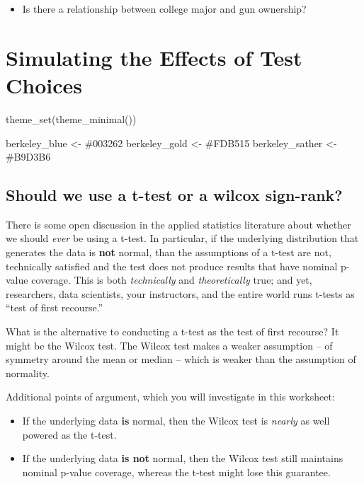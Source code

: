 \documentclass[
  letterpaper,
  DIV=11,
  numbers=noendperiod]{scrreprt}
\newenvironment{Shaded}{\begin{snugshade}}{\end{snugshade}}
\newcommand{\FunctionTok}[1]{\textcolor[rgb]{0.28,0.35,0.67}{#1}}
\newcommand{\NormalTok}[1]{\textcolor[rgb]{0.00,0.23,0.31}{#1}}
\newcommand{\OtherTok}[1]{\textcolor[rgb]{0.00,0.23,0.31}{#1}}
\newcommand{\StringTok}[1]{\textcolor[rgb]{0.13,0.47,0.30}{#1}}
\providecommand{\tightlist}{%
  \setlength{\itemsep}{0pt}\setlength{\parskip}{0pt}}\usepackage{longtable,booktabs,array}
\begin{document}
\begin{itemize}
\tightlist
\item
  Is there a relationship between college major and gun ownership?
\end{itemize}

\section{Simulating the Effects of Test
Choices}\label{simulating-the-effects-of-test-choices}

\begin{Shaded}
\begin{Highlighting}[]
\FunctionTok{theme\_set}\NormalTok{(}\FunctionTok{theme\_minimal}\NormalTok{())}

\NormalTok{berkeley\_blue   }\OtherTok{\textless{}{-}} \StringTok{\textquotesingle{}\#003262\textquotesingle{}}
\NormalTok{berkeley\_gold   }\OtherTok{\textless{}{-}} \StringTok{\textquotesingle{}\#FDB515\textquotesingle{}}
\NormalTok{berkeley\_sather }\OtherTok{\textless{}{-}} \StringTok{\textquotesingle{}\#B9D3B6\textquotesingle{}}
\end{Highlighting}
\end{Shaded}

\subsection{Should we use a t-test or a wilcox
sign-rank?}\label{should-we-use-a-t-test-or-a-wilcox-sign-rank}

There is some open discussion in the applied statistics literature about
whether we should \emph{ever} be using a t-test. In particular, if the
underlying distribution that generates the data is \textbf{not} normal,
than the assumptions of a t-test are not, technically satisfied and the
test does not produce results that have nominal p-value coverage. This
is both \emph{technically} and \emph{theoretically} true; and yet,
researchers, data scientists, your instructors, and the entire world
runs t-tests as ``test of first recourse.''

What is the alternative to conducting a t-test as the test of first
recourse? It might be the Wilcox test. The Wilcox test makes a weaker
assumption -- of symmetry around the mean or median -- which is weaker
than the assumption of normality.

Additional points of argument, which you will investigate in this
worksheet:

\begin{itemize}
\tightlist
\item
  If the underlying data \textbf{is} normal, then the Wilcox test is
  \emph{nearly} as well powered as the t-test.
\item
  If the underlying data \textbf{is not} normal, then the Wilcox test
  still maintains nominal p-value coverage, whereas the t-test might
  lose this guarantee.
\end{itemize}
\end{document}
